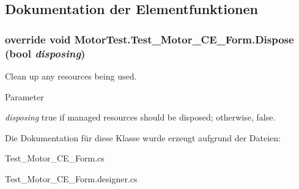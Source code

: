 \subsection{Dokumentation der Elementfunktionen}
\hypertarget{class_motor_test_1_1_test___motor___c_e___form_aed039c8b2c800c4acbd63f0c69955258}{
\subsubsection[{Dispose}]{\setlength{\rightskip}{0pt plus 5cm}override void MotorTest.Test\_\-Motor\_\-CE\_\-Form.Dispose (bool {\em disposing})}}
\label{class_motor_test_1_1_test___motor___c_e___form_aed039c8b2c800c4acbd63f0c69955258}


Clean up any resources being used. 


\begin{DoxyParams}{Parameter}
\item[{\em disposing}]true if managed resources should be disposed; otherwise, false.\end{DoxyParams}


Die Dokumentation für diese Klasse wurde erzeugt aufgrund der Dateien:\begin{DoxyCompactItemize}
\item 
Test\_\-Motor\_\-CE\_\-Form.cs\item 
Test\_\-Motor\_\-CE\_\-Form.designer.cs\end{DoxyCompactItemize}

